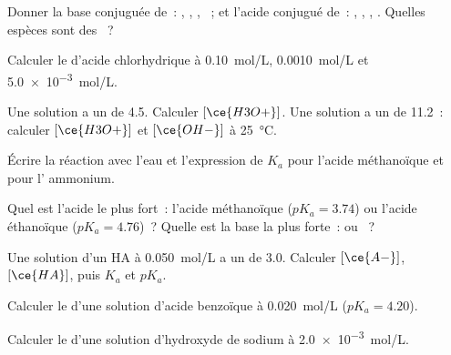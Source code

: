 \begin{exercise}[$\star$]\label{exo:g12:ka-and-pka:1}
Donner la base conjuguée de~: , , ,
~; et l'acide conjugué de~: , , ,
.
Quelles espèces sont des ~?
\end{exercise}

\begin{exercise}[$\star$]\label{exo:g12:ka-and-pka:2}
Calculer le  d'acide chlorhydrique à \qty{0.10}{mol/L},
\qty{0.0010}{mol/L} et \qty{5.0e-3}{mol/L}.
\end{exercise}

\begin{exercise}[$\star$]\label{exo:g12:ka-and-pka:3}
Une solution a un  de 4.5. Calculer $[\ce{H3O+}]$. Une solution a un
 de 11.2~:
calculer $[\ce{H3O+}]$ et $[\ce{OH-}]$ à \qty{25}{\celsius}.
\end{exercise}

\begin{exercise}[$\star$]\label{exo:g12:ka-and-pka:4}
Écrire la réaction avec l'eau et l'expression de $K_a$ pour l'acide
méthanoïque et pour l' ammonium.
\end{exercise}

\begin{exercise}[$\star$]\label{exo:g12:ka-and-pka:5}
Quel est l'acide le plus fort~: l'acide méthanoïque ($pK_a = 3.74$) ou
l'acide éthanoïque ($pK_a = 4.76$)~? Quelle est la base la plus forte~:
 ou
~?
\end{exercise}

\begin{exercise}[$\star\star$]\label{exo:g12:ka-and-pka:6}
Une solution d'un  HA à \qty{0.050}{mol/L} a un  de 3.0.
Calculer
$[\ce{A-}]$, $[\ce{HA}]$, puis $K_a$ et $pK_a$.
\end{exercise}

\begin{exercise}[$\star\star$]\label{exo:g12:ka-and-pka:7}
Calculer le  d'une solution d'acide benzoïque à \qty{0.020}{mol/L}
($pK_a = 4.20$).
\end{exercise}

\begin{exercise}[$\star\star$]\label{exo:g12:ka-and-pka:8}
Calculer le  d'une solution d'hydroxyde de sodium à
\qty{2.0e-3}{mol/L}.
\end{exercise}

